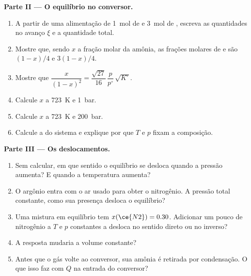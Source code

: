 \begin{problem}
\medskip
\noindent\textbf{Parte II --- O equilíbrio no conversor.}
\begin{enumerate}[resume]
  \item A partir de uma alimentação de \qty{1}{mol} de  e \qty{3}{mol} de , escreva as
        quantidades no avanço $\xi$ e a quantidade total.
  \item Mostre que, sendo $x$ a fração molar da amônia, as frações molares
        de  e  são $(1-x)/4$ e $3(1-x)/4$.
  \item Mostre que $\dfrac{x}{(1-x)^2} = \dfrac{\sqrt{27}}{16}\,\dfrac{p}{p^\circ}\,
        \sqrt{K^\circ}$.
  \item Calcule $x$ a \qty{723}{K} e \qty{1}{bar}.
  \item Calcule $x$ a \qty{723}{K} e \qty{200}{bar}.
  \item Calcule a  do sistema e explique por que $T$ e $p$ fixam a
        composição.
\end{enumerate}

\medskip
\noindent\textbf{Parte III --- Os deslocamentos.}
\begin{enumerate}[resume]
  \item Sem calcular, em que sentido o equilíbrio se desloca quando a pressão
        aumenta? E quando a temperatura aumenta?
  \item O argônio entra com o ar usado para obter o nitrogênio. A pressão
        total constante, como sua presença desloca o equilíbrio?
  \item Uma mistura em equilíbrio tem $x(\ce{N2}) = 0.30$. Adicionar um pouco
        de nitrogênio a $T$ e $p$ constantes a desloca no sentido direto ou no inverso?
  \item A resposta mudaria a volume constante?
  \item Antes que o gás volte ao conversor, sua amônia é retirada por
        condensação. O que isso faz com $Q$ na entrada do conversor?
\end{enumerate}


\end{problem}
